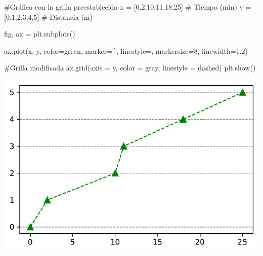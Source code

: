 \documentclass[
  letterpaper,
  DIV=11,
  numbers=noendperiod]{scrreprt}
\newenvironment{Shaded}{\begin{snugshade}}{\end{snugshade}}
\newcommand{\CommentTok}[1]{\textcolor[rgb]{0.37,0.37,0.37}{#1}}
\newcommand{\DecValTok}[1]{\textcolor[rgb]{0.68,0.00,0.00}{#1}}
\newcommand{\FloatTok}[1]{\textcolor[rgb]{0.68,0.00,0.00}{#1}}
\newcommand{\NormalTok}[1]{\textcolor[rgb]{0.00,0.23,0.31}{#1}}
\newcommand{\OperatorTok}[1]{\textcolor[rgb]{0.37,0.37,0.37}{#1}}
\newcommand{\StringTok}[1]{\textcolor[rgb]{0.13,0.47,0.30}{#1}}
\begin{document}
\begin{Shaded}
\begin{Highlighting}[]
\CommentTok{\#Gráfica con la grilla preestablecida}
\NormalTok{x }\OperatorTok{=}\NormalTok{ [}\DecValTok{0}\NormalTok{,}\DecValTok{2}\NormalTok{,}\DecValTok{10}\NormalTok{,}\DecValTok{11}\NormalTok{,}\DecValTok{18}\NormalTok{,}\DecValTok{25}\NormalTok{]   }\CommentTok{\# Tiempo (min)}
\NormalTok{y }\OperatorTok{=}\NormalTok{ [}\DecValTok{0}\NormalTok{,}\DecValTok{1}\NormalTok{,}\DecValTok{2}\NormalTok{,}\DecValTok{3}\NormalTok{,}\DecValTok{4}\NormalTok{,}\DecValTok{5}\NormalTok{]       }\CommentTok{\# Distancia (m)}

\NormalTok{fig, ax }\OperatorTok{=}\NormalTok{ plt.subplots()}

\NormalTok{ax.plot(x, y, color}\OperatorTok{=}\StringTok{\textquotesingle{}green\textquotesingle{}}\NormalTok{, marker}\OperatorTok{=}\StringTok{\textquotesingle{}\^{}\textquotesingle{}}\NormalTok{, linestyle}\OperatorTok{=}\StringTok{\textquotesingle{}{-}{-}\textquotesingle{}}\NormalTok{, markersize}\OperatorTok{=}\DecValTok{8}\NormalTok{, linewidth}\OperatorTok{=}\FloatTok{1.2}\NormalTok{)}

\CommentTok{\#Grilla modificada}
\NormalTok{ax.grid(axis }\OperatorTok{=} \StringTok{\textquotesingle{}y\textquotesingle{}}\NormalTok{, color }\OperatorTok{=} \StringTok{\textquotesingle{}gray\textquotesingle{}}\NormalTok{, linestyle }\OperatorTok{=} \StringTok{\textquotesingle{}dashed\textquotesingle{}}\NormalTok{)}
\NormalTok{plt.show()}
\end{Highlighting}
\end{Shaded}

\includegraphics{unidad_6_files/figure-pdf/cell-113-output-1.pdf}
\end{document}
